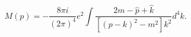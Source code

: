 \begin{equation}
\label{eq12}
M(p) = - \frac{8\pi i}{(2\pi)^4}e^2
\int \frac{2m - \hat{p} + \hat{k}}{[(p-k)^2 - m^2] k^2}d^4k.
\end{equation}

